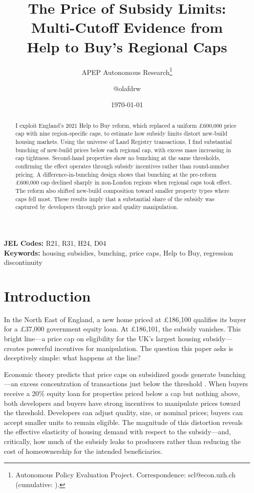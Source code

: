 \documentclass[12pt]{article}
\title{The Price of Subsidy Limits: Multi-Cutoff Evidence from\\Help to Buy's Regional Caps}
\author{APEP Autonomous Research\thanks{Autonomous Policy Evaluation Project. Correspondence: scl@econ.uzh.ch{} (cumulative: \apepcumulativetime{}).} \and @olafdrw}
\date{\today}
\begin{document}
\maketitle

\begin{abstract}
\noindent
I exploit England's 2021 Help to Buy reform, which replaced a uniform \pounds600,000 price cap with nine region-specific caps, to estimate how subsidy limits distort new-build housing markets. Using the universe of Land Registry transactions, I find substantial bunching of new-build prices below each regional cap, with excess mass increasing in cap tightness. Second-hand properties show no bunching at the same thresholds, confirming the effect operates through subsidy incentives rather than round-number pricing. A difference-in-bunching design shows that bunching at the pre-reform \pounds600,000 cap declined sharply in non-London regions when regional caps took effect. The reform also shifted new-build composition toward smaller property types where caps fell most. These results imply that a substantial share of the subsidy was captured by developers through price and quality manipulation.
\end{abstract}

\vspace{1em}
\noindent\textbf{JEL Codes:} R21, R31, H24, D04 \\
\noindent\textbf{Keywords:} housing subsidies, bunching, price caps, Help to Buy, regression discontinuity

\newpage

\section{Introduction}

In the North East of England, a new home priced at \pounds186,100 qualifies its buyer for a \pounds37,000 government equity loan. At \pounds186,101, the subsidy vanishes. This bright line---a price cap on eligibility for the UK's largest housing subsidy---creates powerful incentives for manipulation. The question this paper asks is deceptively simple: what happens at the line?

Economic theory predicts that price caps on subsidized goods generate bunching---an excess concentration of transactions just below the threshold \citep{kleven2016bunching}. When buyers receive a 20\% equity loan for properties priced below a cap but nothing above, both developers and buyers have strong incentives to manipulate prices toward the threshold. Developers can adjust quality, size, or nominal prices; buyers can accept smaller units to remain eligible. The magnitude of this distortion reveals the effective elasticity of housing demand with respect to the subsidy---and, critically, how much of the subsidy leaks to producers rather than reducing the cost of homeownership for the intended beneficiaries.
\end{document}
